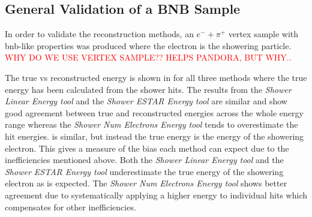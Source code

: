 \subsection{General Validation of a BNB Sample}

In order to validate the reconstruction methods, an $e^- + \pi^+$ vertex sample with \gls{bnb}-like properties was produced where the electron is the showering particle. \textcolor{red}{WHY DO WE USE VERTEX SAMPLE?? HELPS PANDORA, BUT WHY..}

The true vs reconstructed energy is shown in  for all three methods where the true energy has been calculated from the shower hits. The results from the \textit{Shower Linear Energy tool} and the \textit{Shower ESTAR Energy tool} are similar and show good agreement between true and reconstructed energies across the whole energy range whereas the \textit{Shower Num Electrons Energy tool} tends to overestimate the hit energies.  is similar, but instead the true energy is the energy of the showering electron. This gives a measure of the bias each method can expect due to the inefficiencies mentioned above. Both the \textit{Shower Linear Energy tool} and the \textit{Shower ESTAR Energy tool} underestimate the true energy of the showering electron as is expected. The \textit{Shower Num Electrons Energy tool} shows better agreement due to systematically applying a higher energy to individual hits which compensates for other inefficiencies. 

